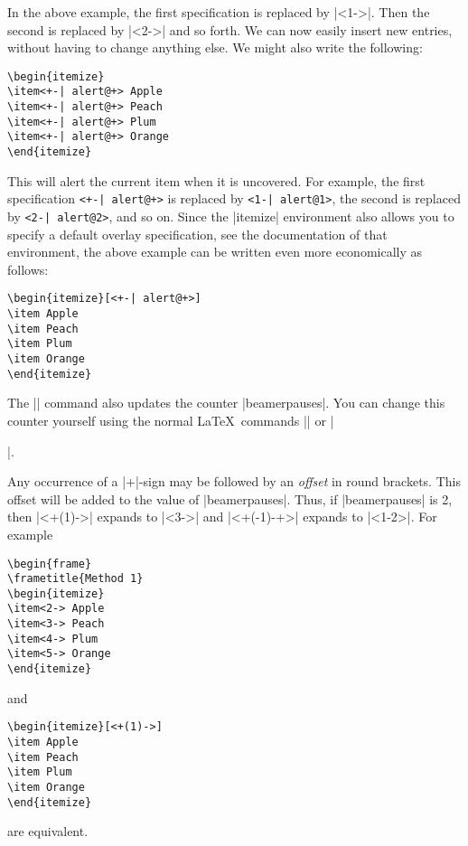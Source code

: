 \begin{original...}
In the above example, the first specification is replaced by |<1->|. Then the second is replaced by |<2->| and so forth. We can now easily insert new entries, without having to change anything else. We might also write the following:
\begin{verbatim}
\begin{itemize}
\item<+-| alert@+> Apple
\item<+-| alert@+> Peach
\item<+-| alert@+> Plum
\item<+-| alert@+> Orange
\end{itemize}
\end{verbatim}

This will alert the current item when it is uncovered. For example, the first specification \verb/<+-| alert@+>/ is replaced by \verb/<1-| alert@1>/, the second is replaced by \verb/<2-| alert@2>/, and so on. Since the |itemize| environment also allows you to specify a default overlay specification, see the documentation of that environment, the above example can be written even more economically as follows:
\begin{verbatim}
\begin{itemize}[<+-| alert@+>]
\item Apple
\item Peach
\item Plum
\item Orange
\end{itemize}
\end{verbatim}

The |\pause| command also updates the counter |beamerpauses|. You can change this counter yourself using the normal \LaTeX\ commands |\setcounter| or |\addtocounter|.

Any occurrence of a |+|-sign may be followed by an
\emph{offset} in round brackets. This offset will
be added to the value of |beamerpauses|. Thus, if
|beamerpauses| is 2, then |<+(1)->| expands to
|<3->| and |<+(-1)-+>| expands to |<1-2>|. For example
\begin{verbatim}
\begin{frame}
\frametitle{Method 1}
\begin{itemize}
\item<2-> Apple
\item<3-> Peach
\item<4-> Plum
\item<5-> Orange
\end{itemize}
\end{verbatim}
and
\begin{verbatim}
\begin{itemize}[<+(1)->]
\item Apple
\item Peach
\item Plum
\item Orange
\end{itemize}
\end{verbatim}
are equivalent.


\end{original...}
